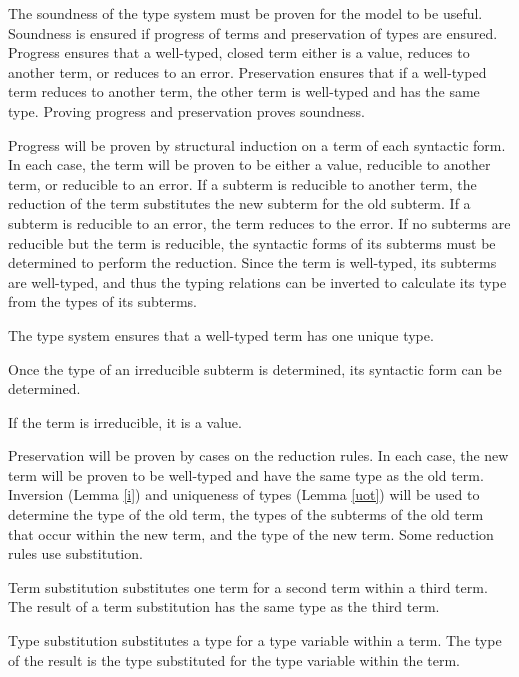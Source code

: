 \documentclass[12pt]{article}
\begin{document}
The soundness of the type system must be proven for the model to be useful.  Soundness is ensured if progress of terms and preservation of types are ensured.  Progress ensures that a well-typed, closed term either is a value, reduces to another term, or reduces to an error.  Preservation ensures that if a well-typed term reduces to another term, the other term is well-typed and has the same type.  Proving progress and preservation proves soundness.

Progress will be proven by structural induction on a term of each syntactic form.  In each case, the term will be proven to be either a value, reducible to another term, or reducible to an error.  If a subterm is reducible to another term, the reduction of the term substitutes the new subterm for the old subterm.  If a subterm is reducible to an error, the term reduces to the error.  If no subterms are reducible but the term is reducible, the syntactic forms of its subterms must be determined to perform the reduction.  Since the term is well-typed, its subterms are well-typed, and thus the typing relations can be inverted to calculate its type from the types of its subterms.



The type system ensures that a well-typed term has one unique type.



Once the type of an irreducible subterm is determined, its syntactic form can be determined.



If the term is irreducible, it is a value.



Preservation will be proven by cases on the reduction rules.  In each case, the new term will be proven to be well-typed and have the same type as the old term.  Inversion (Lemma \ref{i}) and uniqueness of types (Lemma \ref{uot}) will be used to determine the type of the old term, the types of the subterms of the old term that occur within the new term, and the type of the new term.  Some reduction rules use substitution.

Term substitution substitutes one term for a second term within a third term.  The result of a term substitution has the same type as the third term.



Type substitution substitutes a type for a type variable within a term.  The type of the result is the type substituted for the type variable within the term.




\end{document}
